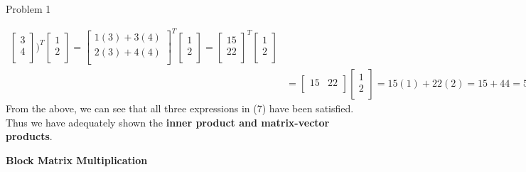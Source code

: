 \begin{problem}{Problem 1}
\begin{highlight}[Solution]
\begin{align*}
                \begin{bmatrix}
                    3 \\
                    4 \\
                \end{bmatrix}
            \Biggr)^{T}
            \begin{bmatrix}
                1 \\
                2 \\
            \end{bmatrix}
            = 
            \begin{bmatrix}
                1(3) + 3(4) \\
                2(3) + 4(4) \\
            \end{bmatrix}^{T}
            \begin{bmatrix}
                1 \\
                2 \\
            \end{bmatrix}
            = 
            \begin{bmatrix}
                15 \\
                22 \\
            \end{bmatrix}^{T}
            \begin{bmatrix}
                1 \\
                2 \\
            \end{bmatrix} \\
            & = 
            \begin{bmatrix}
                15 & 22 \\
            \end{bmatrix}
            \begin{bmatrix}
                1 \\
                2 \\
            \end{bmatrix}
            = 
            15(1) + 22(2) = 15 + 44 = 59.
        \end{align*}
        From the above, we can see that all three expressions in (7) have been satisfied. Thus we have adequately shown the \textbf{inner product and matrix-vector products}. \vspace*{1em}

        \noindent \textbf{Block Matrix Multiplication} \vspace*{1em}


\end{highlight}
\end{problem}
